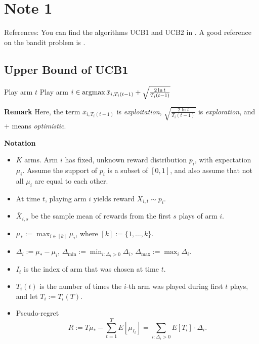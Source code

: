 \section{Note 1}

References: You can find the algorithms UCB1 and UCB2 in \cite{Auer2002}.
A good reference on the bandit problem is \cite{MAL024}.

\subsection{Upper Bound of UCB1} %

\begin{alg}[UCB1] \leavevmode
    \begin{framed}
        \begin{algorithmic}
                \State Play arm $t$
            \EndFor
                \State Play arm $i\in\mathop{\mathrm{argmax}} \bar x_{i,T_i(t-1)} + \sqrt{\frac{2\ln t}{T_i(t-1)}}$
            \EndFor
        \end{algorithmic}
    \end{framed}
\end{alg}

\textbf{Remark}
Here,
the term $\bar x_{i,T_i(t-1)}$ is \emph{exploitation},
$\sqrt{\frac{2\ln t}{T_i(t-1)}}$ is \emph{exploration},
and $+$ means \emph{optimistic}.

\textbf{Notation}
\begin{itemize}
    \item $K$ arms.
        Arm $i$ has fixed, unknown reward distribution $p_i$,
        with expectation $\mu_i$.
        Assume the support of $p_i$ is a subset of $[0,1]$, and
        also assume that not all $\mu_i$ are equal to each other.
    \item At time $t$, playing arm $i$ yields reward $X_{i,t}\sim p_i$.
    \item $\bar X_{i,s}$ be the sample mean of rewards from the first $s$ plays of arm $i$.
    \item $\mu_*:=\max_{i\in[k]}\mu_i$, where $[k]:=\{1,\dots,k\}$.
    \item $\Delta_i:=\mu_* - \mu_i$,
        $\Delta_{\text{min}}:=\min_{i:\Delta_i>0}\Delta_i$,
        $\Delta_{\text{max}}:=\max_i \Delta_i$.
    \item $I_t$ is the index of arm that was chosen at time $t$.
    \item $T_i(t)$ is the number of times the $i$-th arm was played during first $t$ plays,
        and let $T_i:=T_i(T)$.
    \item Pseudo-regret
        \begin{equation}
            R:=T\mu_*-\sum_{t=1}^T E[\mu_{I_t}]
            = \sum_{i:\Delta_i>0} E[T_i]\cdot\Delta_i.
        \end{equation}
\end{itemize}

